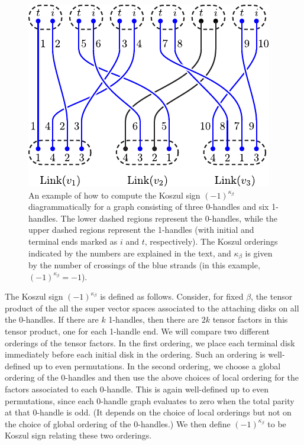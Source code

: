 \begin{figure} 
\centering
\includegraphics{KoszulFig.pdf} 
\caption{\label{KoszulFig} 
An example of how to compute the Koszul sign $(-1)^{\kappa_\beta}$ diagrammatically  
for a graph consisting of three 0-handles and six 1-handles. 
The lower dashed regions represent the 0-handles, while the upper dashed regions 
represent the 1-handles (with initial and terminal ends marked as $i$ and $t$, respectively). 
The Koszul orderings indicated by the numbers are explained in the text, and 
$\kappa_\beta$ is given by the number of crossings of the blue strands (in this example, 
$(-1)^{\kappa_\beta}=-1$).
}
\end{figure}


The Koszul sign $(-1)^{\kappa_\beta}$ is defined as follows.
Consider, for fixed $\beta$, the tensor product of the all the super vector spaces
associated to the attaching disks on all the 0-handles.
If there are $k$ 1-handles, then there are $2k$ tensor factors in this tensor product, one 
for each 1-handle end. 
We will compare two different orderings of the tensor factors.
In the first ordering, we place each terminal disk immediately before each initial disk in the ordering.
Such an ordering is well-defined up to even permutations.
In the second ordering, 
we choose a global ordering of the 0-handles and then
use the above choices of local ordering for the factors associated to
each 0-handle.
This is again well-defined up to even permutations, since each 0-handle graph evaluates to zero when the total
parity at that 0-handle is odd.
(It depends on the choice of local orderings but not on the choice of global ordering of the 0-handles.)
We then define $(-1)^{\kappa_\beta}$ to be Koszul sign relating these two orderings. 

